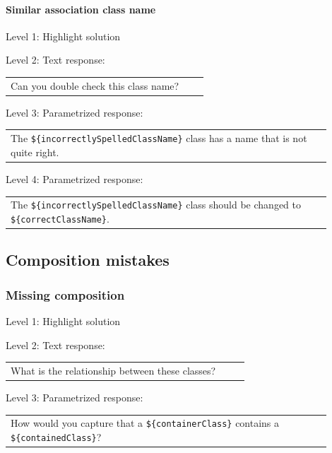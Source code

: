 \paragraph{Similar association class name}

\noindent Level 1: Highlight solution \medskip

\noindent Level 2: Text response: \medskip

\begin{tabular}{|p{0.9\linewidth}}
Can you double check this class name?
\end{tabular} \medskip

\noindent Level 3: Parametrized response: \medskip

\begin{tabular}{|p{0.9\linewidth}}
The \verb|${incorrectlySpelledClassName}| class has a name that is not quite right.
\end{tabular} \medskip

\noindent Level 4: Parametrized response: \medskip

\begin{tabular}{|p{0.9\linewidth}}
The \verb|${incorrectlySpelledClassName}| class should be changed to \verb|${correctClassName}|.
\end{tabular} \medskip



\subsection{Composition mistakes}

\subsubsection{Missing composition}

\noindent Level 1: Highlight solution \medskip

\noindent Level 2: Text response: \medskip

\begin{tabular}{|p{0.9\linewidth}}
What is the relationship between these classes?
\end{tabular} \medskip

\noindent Level 3: Parametrized response: \medskip

\begin{tabular}{|p{0.9\linewidth}}
How would you capture that a \verb|${containerClass}| contains a \verb|${containedClass}|?
\end{tabular} \medskip

